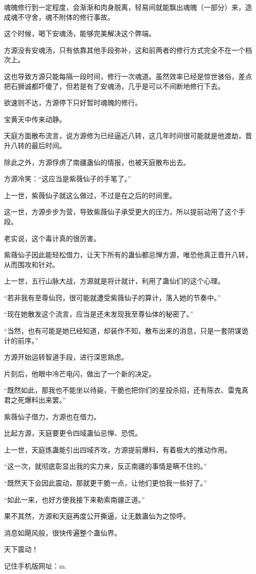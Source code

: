 \begin{this_body}
魂魄修行到一定程度，会渐渐和肉身脱离，轻易间就能飘出魂魄（一部分）来，造成魂不守舍，魂不附体的修行事故。

这个时候，喝下安魂汤，能够完美解决这个弊端。

方源没有安魂汤，只有依靠其他手段弥补，这和前两者的修行方式完全不在一个档次上。

这也导致方源只能每隔一段时间，修行一次魂道。虽然效率已经是惊世骇俗，差点把石狮诚都吓傻了，但若是有了安魂汤，几乎是可以不间断地修行下去。

欲速则不达，方源停下只好暂时魂魄的修行。

宝黄天中传来动静。

天庭方面散布流言，说方源修为已经逼近八转，这几年时间很可能就是他渡劫，晋升八转的最后时间。

除此之外，方源俘虏了南疆蛊仙的情报，也被天庭散布出去。

方源冷笑：“这应当是紫薇仙子的手笔了。”

上一世，紫薇仙子就这么做过，不过是在之后的时间里。

这一世，方源步步为营，导致紫薇仙子承受更大的压力，所以提前动用了这个手段。

老实说，这个毒计真的很厉害。

紫薇仙子因此能轻松借力，让天下所有的蛊仙都忌惮方源，唯恐他真正晋升八转，从而围攻和针对。

上一世，五行山脉大战，方源就是将计就计，利用了蛊仙们的这个心理。

“若非我有至尊仙窍，很可能就遭受紫薇仙子的算计，落入她的节奏中。”

“现在她散发这个流言，应当是还未发现我至尊仙体的秘密了。”

“当然，也有可能是她已经知道，却装作不知，散布出来的消息，只是一套阴谋诡计的前序。”

方源开始运转智道手段，进行深思熟虑。

片刻后，他眼中冷芒电闪，做出了一个新的决定。

“既然如此，那我也不能坐以待毙，干脆也把你们的星投杀招，还有陈衣、雷鬼真君之死爆料出来罢。”

紫薇仙子借力，方源也在借力。

比起方源，天庭要更令四域蛊仙忌惮、恐慌。

上一世，天庭炼蛊能引出四域齐攻，方源提前爆料，有着极大的推动作用。

“这一次，就彻底彰显出我的实力来，反正南疆的事情是瞒不住的。”

“既然天下会因此震动，那就更干脆一点，让他们更怕我一些好了。”

“如此一来，也好方便我接下来勒索南疆正道。”

果不其然，方源和天庭再度公开撕逼，让无数蛊仙为之惊呼。

消息如飓风般，很快传遍整个蛊仙界。

天下震动！

记住手机版网址：m.

\end{this_body}

